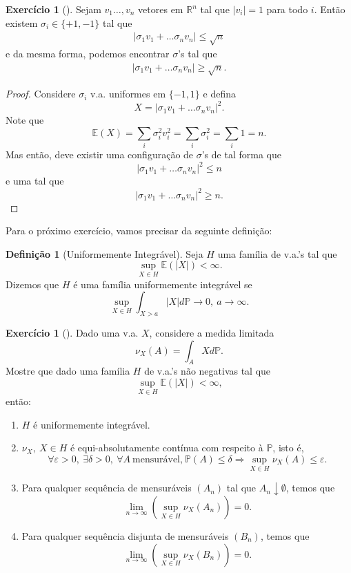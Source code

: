 \documentclass[12pt,a4paper,oneside]{book}
\theoremstyle{definition}
\newtheorem{definition}[theorem]{Defini\c{c}\~ao}
\newtheorem{xca}[theorem]{Exerc\'icio}
\theoremstyle{remark}
\numberwithin{equation}{section}
\newcommand{\R}{\mathbb{R}}
\newcommand{\e}{\varepsilon}
\newcommand{\E}{\mathbb{E}}
\newcommand{\pr}{\mathbb{P}}
\begin{document}
\begin{xca}[\cite{spencer-probMethod}]
Sejam $v_1\dots,v_n$ vetores em $\R^n$ tal que $|v_i|=1$ para todo $i.$ Então existem $\sigma_i\in\{+1,-1\}$ tal que 
\begin{align*}
|\sigma_1v_1+\dots\sigma_nv_n|\leq \sqrt{n}
\end{align*}
e da mesma forma, podemos encontrar $\sigma$'s tal que
\begin{align*}
|\sigma_1v_1+\dots\sigma_nv_n|\geq \sqrt{n}.
\end{align*}
\begin{proof}
Considere $\sigma_i$ v.a. uniformes em $\{-1,1\}$ e defina 
$$X = |\sigma_1v_1+\dots\sigma_nv_n|^2 .$$
Note que 
$$\E(X) = \sum_i \sigma_i^2v_i^2 = \sum_i \sigma_i^2 = \sum_i 1 = n .$$
Mas então, deve existir uma configuração de  $\sigma$'s de tal forma que 
$$|\sigma_1v_1+\dots\sigma_nv_n|^2\leq n$$
e uma tal que 
$$|\sigma_1v_1+\dots\sigma_nv_n|^2\geq n.$$
\end{proof}

\end{xca}


Para o próximo exercício, vamos precisar da seguinte definição:

\begin{definition}[Uniformemente Integrável]
Seja $H$ uma família de v.a.'s  tal que
$$\sup_{X\in H} \E(|X|)<\infty. $$
Dizemos que $H$ é uma família uniformemente integrável se 
$$\sup_{X\in H} \int_{X>a}|X|d\pr \rightarrow 0,\ a \rightarrow \infty. $$
\end{definition}

\begin{xca}[\cite{chaumont_yor_2012}] 

Dado uma v.a. $X$, considere  a medida limitada
$$ \nu_X(A) = \int_A Xd\pr. $$
Mostre que dado uma família $H$ de v.a.'s não negativas tal que
$$\sup_{X\in H} \E(|X|)<\infty, $$
 então:
\begin{enumerate}
\item $H$ é uniformemente integrável.
\item $\nu_X,\ X\in H$ é equi-absolutamente contínua com respeito à $\pr$, isto é,
$$\forall \e>0,\ \exists \delta>0,\ \forall A\  \textrm{mensurável,}\ \pr(A)\leq \delta \Rightarrow \sup_{X\in H}\nu_X(A)\leq \e. $$
\item Para qualquer sequência  de mensuráveis $(A_n)$ tal que $A_n \downarrow \emptyset$, temos que
$$\lim_{n\rightarrow \infty} \left( \sup_{X\in H} \nu_X(A_n)\right) = 0.$$
\item Para qualquer sequência  disjunta de mensuráveis $(B_n)$, temos que
$$\lim_{n\rightarrow \infty} \left( \sup_{X\in H} \nu_X(B_n)\right) = 0.$$
\end{enumerate}
\end{xca}
\end{document}
